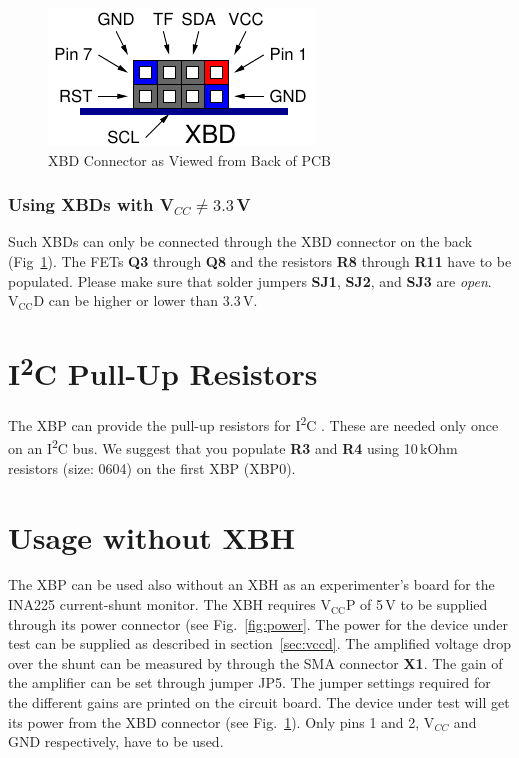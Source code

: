 \documentclass[twoside,11pt]{cergdoc}
\newcommand{\ITwoC}{I\textsuperscript{2}C }
\begin{document}
\begin{figure}[ht]
  \begin{center}
    \includegraphics[scale=1]{figures/xbd_connector}
    \caption{XBD Connector as Viewed from Back of PCB}\label{fig:xbd}
  \end{center}
\vspace{-1ex}
\end{figure}

\subsubsection{Using XBDs with V$_{CC} \not= 3.3$\,V}
Such XBDs can only be connected through the XBD connector on the back (Fig~\ref{fig:xbd}).
The FETs \textbf{Q3} through \textbf{Q8} and the resistors \textbf{R8}  through \textbf{R11}
 have to be populated.
Please make sure that solder jumpers \textbf{SJ1}, \textbf{SJ2}, and \textbf{SJ3} 
are \emph{open}. $\mathrm{V_{CC}D}$ can be higher or lower than 3.3\,V.

\section{\ITwoC Pull-Up Resistors}\label{sec:i2cr}
The XBP can provide the pull-up resistors for \ITwoC. These are needed only once on an 
\ITwoC bus. We suggest that you populate \textbf{R3} and \textbf{R4} using 
10\,kOhm resistors (size: 0604) on the first XBP (XBP0).

\section{Usage without XBH}\label{sec:noXBH}
The XBP can be used also without an XBH as an experimenter's board for the INA225 
current-shunt monitor. The XBH requires $\mathrm{V_{CC}P}$ of 5\,V to be supplied
through its power connector (see Fig.~\ref{fig:power}. The power for the device 
under test can be supplied as described in section~\ref{sec:vccd}. The amplified
voltage drop over the shunt can be measured by through the SMA connector \textbf{X1}.
The gain of the amplifier can be set through jumper JP5. The jumper settings required
for the different gains are printed on the circuit board. The device under test will
get its power from the XBD connector (see Fig.~\ref{fig:xbd}). Only pins 1 and 2,
V$_{CC}$ and GND respectively, have to be used.
\end{document}
